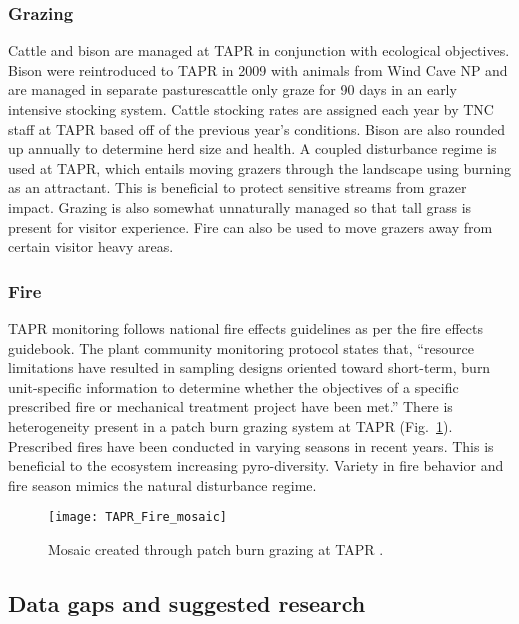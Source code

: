 \subsubsection{Grazing }

Cattle and bison are managed at TAPR in conjunction with ecological objectives. 
Bison were reintroduced to TAPR in 2009 with animals from Wind Cave NP and are managed in separate pastures\textemdash  cattle only graze for 90 days in an early intensive stocking system. 
Cattle stocking rates are assigned each year by TNC staff at TAPR based off of the previous year's conditions. 
Bison are also rounded up annually to determine herd size and health.
 A coupled disturbance regime is used at TAPR, which entails moving grazers through the landscape using burning as an attractant. 
This is beneficial to protect sensitive streams from grazer impact. 
Grazing is also somewhat unnaturally managed so that tall grass is present for visitor experience. 
Fire can also be used to move grazers away from certain visitor heavy areas.

\subsubsection{Fire }

TAPR monitoring follows national fire effects guidelines as per the fire effects guidebook. 
The plant community monitoring protocol states that, ``resource limitations have
resulted in sampling designs oriented toward short-term, burn unit-specific information to determine whether the objectives of a specific prescribed fire or mechanical treatment project have been met.'' 
There is heterogeneity present in a patch burn grazing system at TAPR (Fig.~\ref{fig:TAPRfiremosaic}). 
Prescribed fires have been conducted in varying seasons in recent years. 
This is beneficial to the ecosystem increasing pyro-diversity. 
Variety in fire behavior and fire season mimics the natural disturbance regime.

\begin{figure}
	\texttt{[image: TAPR\_Fire\_mosaic]}
	\caption[TAPR fire mosaic]
	{Mosaic created through patch burn grazing at TAPR \citep{leis2018}. }
	\label{fig:TAPRfiremosaic}
\end{figure}

\subsection{Data gaps and suggested research}

